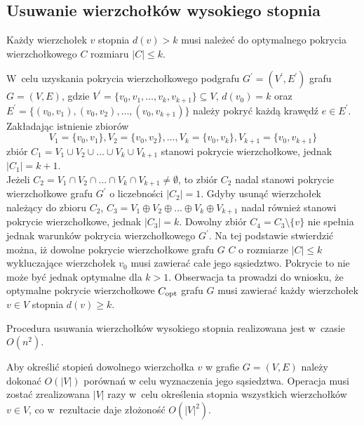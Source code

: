 \subsection{Usuwanie wierzchołków wysokiego stopnia}\label{section_kernelization_high-degree}

\begin{theorem}
  Każdy wierzchołek $v$ stopnia $d(v) > k$ musi należeć do optymalnego pokrycia wierzchołkowego 
  $C$ rozmiaru $|C| \leq k$.
\end{theorem}
\begin{bproof}
  W~celu uzyskania pokrycia wierzchołkowego podgrafu $G^\prime=(V^\prime,E^\prime)$
  grafu $G=(V,E)$, gdzie $V^\prime=\{v_0, v_1, \ldots, v_k, v_{k+1}\} \subseteq V$, $d(v_0)=k$ oraz \\
  $E^\prime=\{(v_0,v_1), (v_0,v_2), \ldots, (v_0,v_{k+1})\}$ należy pokryć każdą krawędź $e \in E^\prime$.
  Zakładając istnienie zbiorów \[V_1=\{v_0,v_1\}, V_2=\{v_0,v_2\}, \ldots,
  V_k=\{v_0,v_k\},V_{k+1}=\{v_0,v_{k+1}\}\]
  zbiór $C_1=V_1 \cup V_2 \cup \ldots \cup V_k \cup V_{k+1}$ stanowi pokrycie wierzchołkowe, jednak $|C_1| = k +1$.\\
  Jeżeli $C_2=V_1 \cap V_2 \cap \ldots \cap V_k \cap V_{k+1} \neq \emptyset$, to zbiór $C_2$ nadal stanowi pokrycie wierzchołkowe grafu $G^\prime$ o liczebności
  $|C_2|=1$.
  Gdyby usunąć wierzchołek należący do zbioru $C_2$, $C_3=V_1 \oplus V_2 \oplus \ldots \oplus V_k \oplus V_{k+1}$ nadal
  również stanowi pokrycie wierzchołkowe, jednak $|C_3|=k$.
  Dowolny zbiór $C_4=C_3 \setminus \{v\}$ nie spełnia jednak warunków pokrycia wierzchołkowego $G^\prime$.
  Na tej podstawie stwierdzić można, iż dowolne pokrycie wierzchołkowe grafu $G$ 
  $C$ o rozmiarze $|C| \leq k$ wykluczające wierzchołek $v_0$ musi zawierać całe jego
  sąsiedztwo. Pokrycie to nie może być jednak optymalne dla $k > 1$.
  Obserwacja ta prowadzi do wniosku, że optymalne pokrycie wierzchołkowe
  $C_{\textnormal{opt}}$ grafu $G$ musi zawierać każdy wierzchołek $v \in V$ stopnia $d(v) \geq k$.
\end{bproof}

\begin{theorem}
  Procedura usuwania wierzchołków wysokiego stopnia realizowana jest w~czasie $O(n^2)$.
\end{theorem}
\begin{bproof}
  Aby określić stopień dowolnego wierzchołka $v$ w grafie $G=(V,E)$ należy 
  dokonać $O(|V|)$ porównań w celu wyznaczenia jego sąsiedztwa.
  Operacja musi zostać zrealizowana $|V|$ razy w~celu określenia stopnia
  wszystkich wierzchołków $v \in V$, co w~rezultacie daje złożoność $O (|V|^2)$.
\end{bproof}

